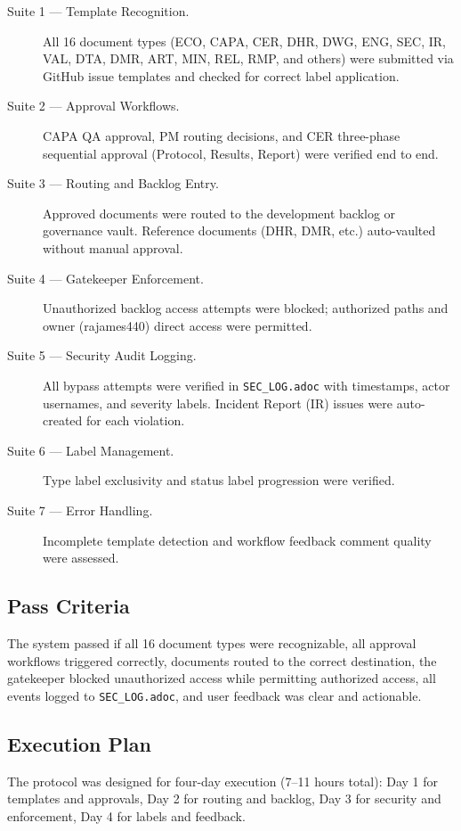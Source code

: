 \begin{description}
  \item[Suite 1 — Template Recognition.]
        All 16 document types (ECO, CAPA, CER, DHR, DWG, ENG, SEC, IR,
        VAL, DTA, DMR, ART, MIN, REL, RMP, and others) were submitted via
        GitHub issue templates and checked for correct label application.
  \item[Suite 2 — Approval Workflows.]
        CAPA QA approval, PM routing decisions, and CER three-phase
        sequential approval (Protocol, Results, Report) were verified end
        to end.
  \item[Suite 3 — Routing and Backlog Entry.]
        Approved documents were routed to the development backlog or
        governance vault. Reference documents (DHR, DMR, etc.) auto-vaulted
        without manual approval.
  \item[Suite 4 — Gatekeeper Enforcement.]
        Unauthorized backlog access attempts were blocked; authorized
        paths and owner (rajames440) direct access were permitted.
  \item[Suite 5 — Security Audit Logging.]
        All bypass attempts were verified in \texttt{SEC\_LOG.adoc} with
        timestamps, actor usernames, and severity labels. Incident Report
        (IR) issues were auto-created for each violation.
  \item[Suite 6 — Label Management.]
        Type label exclusivity and status label progression were verified.
  \item[Suite 7 — Error Handling.]
        Incomplete template detection and workflow feedback comment quality
        were assessed.
\end{description}

\subsection{Pass Criteria}

The system passed if all 16 document types were recognizable, all approval
workflows triggered correctly, documents routed to the correct destination,
the gatekeeper blocked unauthorized access while permitting authorized
access, all events logged to \texttt{SEC\_LOG.adoc}, and user feedback was
clear and actionable.

\subsection{Execution Plan}

The protocol was designed for four-day execution (7--11 hours total):
Day 1 for templates and approvals, Day 2 for routing and backlog, Day 3
for security and enforcement, Day 4 for labels and feedback.
